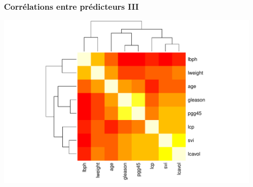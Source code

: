 \documentclass{beamer}\usepackage[]{graphicx}\usepackage[]{color}
\newenvironment{knitrout}{}{} %
\begin{document}
\begin{frame}
\begin{knitrout}
\end{knitrout}

\end{frame}

\begin{frame}[containsverbatim]
  \frametitle{Corrélations entre prédicteurs III}

\begin{knitrout}\scriptsize
{}\color{fgcolor}
\includegraphics[width=\textwidth]{figures/olsunnamed-chunk-15-1} 

\end{knitrout}

\end{frame}
\end{document}
